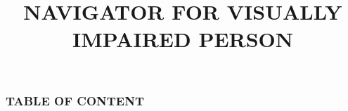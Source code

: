\documentclass[
	11pt, %
	t, %
	aspectratio=169, %
]{beamer}
\title[Short Title]{NAVIGATOR FOR VISUALLY IMPAIRED PERSON} %
\author[]{
\bigskip
\newline
\text{\textbf{Guide:}}
\newline
\text{ Prof. S.S. Patil}
\bigskip
\newline
\text{ \textbf{Students:}}
\newline
\text{Nikhil Kanitkar (23)}
\newline
\text{Dewoo Kudtarkar (27)}
\newline
\text{Mandar Naik (40)}
\newline
\text{Pranit Patil (48)}
} %
\date[\today]{} %
\begin{document}

\begin{frame}
	\titlepage %
\end{frame}



\begin{frame}
	\frametitle{TABLE OF CONTENT} %
	
	\tableofcontents %
\end{frame}

\end{document}
